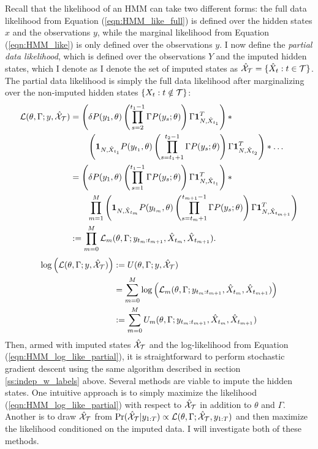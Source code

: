 Recall that the likelihood of an HMM can take two different forms: the full data likelihood from Equation (\ref{eqn:HMM_like_full}) is defined over the hidden states $x$ and the observations $y$, while the marginal likelihood from Equation (\ref{eqn:HMM_like}) is only defined over the observations $y$. I now define the \textit{partial data likelihood}, which is defined over the observations $Y$ and the imputed hidden states, which I denote as  I denote the set of imputed states as $\hat {\mathcal{X}}_{\mathcal{T}} = \{\hat X_t : t \in \mathcal{T}\}$. The partial data likelihood is simply the full data likelihood after marginalizing over the non-imputed hidden states $\{X_t: t \notin \mathcal{T}\}$:
%
\begin{align}
    \mathcal{L}(\theta,\Gamma;y,\hat {\mathcal{X}}_{\mathcal{T}}) &= \left(\delta P(y_1,\theta) \left(\prod_{s=2}^{t_1-1} \Gamma P(y_s;\theta)\right) \Gamma \mathbf{1}^T_{N,\hat X_{t_1}}\right) * \nonumber \\
    & \qquad \left(\mathbf{1}_{N,\hat X_{t_1}} P(y_{t_1},\theta) \left(\prod_{s=t_1+1}^{t_2-1} \Gamma P(y_s;\theta)\right) \Gamma \mathbf{1}^T_{N,\hat X_{t_2}}\right) * \ldots \nonumber \\
    &= \left(\delta P(y_1,\theta) \left(\prod_{s=1}^{t_1-1} \Gamma P(y_s;\theta)\right) \Gamma \mathbf{1}_{N,\hat X_{t_1}}^T\right) * \nonumber \\
    & \qquad \prod_{m=1}^{M} \left( \mathbf{1}_{N,\hat X_{t_m}} P(y_{t_m},\theta) \left(\prod_{s=t_m+1}^{t_{m+1}-1} \Gamma P(y_s;\theta)\right) \Gamma \mathbf{1}_{N,\hat X_{t_{m+1}}}^T\right)  \nonumber \\
    &:= \prod_{m=0}^{M} \mathcal{L}_m(\theta,\Gamma;y_{t_m:t_{m+1}},\hat X_{t_m},\hat X_{t_{m+1}}).
    \label{eqn:HMM_like_partial}
\end{align}
%
\begin{align}
    \log\left(\mathcal{L}(\theta,\Gamma;y,\hat {\mathcal{X}}_{\mathcal{T}})\right) &:= U(\theta,\Gamma;y,\hat {\mathcal{X}}_{\mathcal{T}}) \nonumber \\
    &= \sum_{m=0}^{M} \log\left(\mathcal{L}_m(\theta,\Gamma;y_{t_m:t_{m+1}},\hat X_{t_m},\hat X_{t_{m+1}})\right) \nonumber \\
    &:= \sum_{m=0}^{M} U_m(\theta,\Gamma;y_{t_m:t_{m+1}},\hat X_{t_m},\hat X_{t_{m+1}})
    \label{eqn:HMM_log_like_partial}
\end{align}
%
Then, armed with imputed states $\hat {\mathcal{X}}_{\mathcal{T}}$ and the log-likelihood from Equation (\ref{eqn:HMM_log_like_partial}), it is straightforward to perform stochastic gradient descent using the same algorithm described in section \ref{ss:indep_w_labels} above. Several methods are viable to impute the hidden states. One intuitive approach is to simply maximize the likelihood (\ref{eqn:HMM_log_like_partial}) with respect to $\hat {\mathcal{X}}_{\mathcal{T}}$ in addition to $\theta$ and $\Gamma$. Another is to draw $\hat {\mathcal{X}}_{\mathcal{T}}$ from $\Pr(\hat {\mathcal{X}}_{\mathcal{T}} | y_{1:T}) \propto \mathcal{L}(\theta,\Gamma;\hat {\mathcal{X}}_{\mathcal{T}},y_{1:T})$ and then maximize the likelihood conditioned on the imputed data. I will investigate both of these methods.

